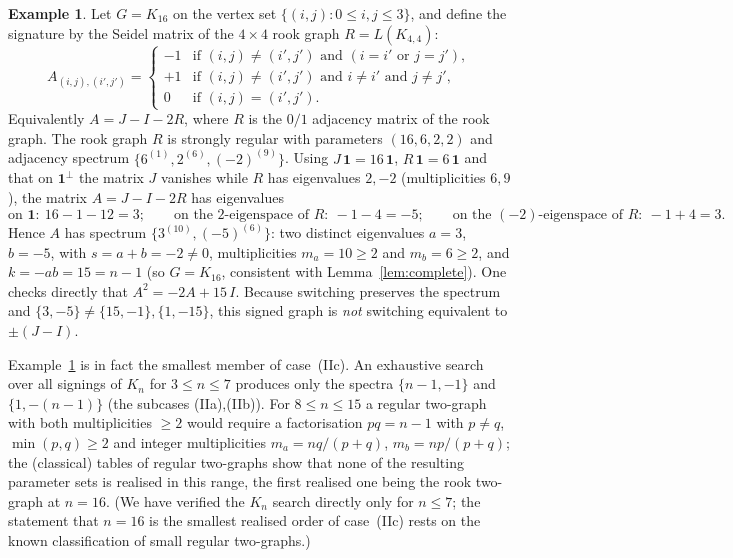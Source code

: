 \documentclass{amsart}
\theoremstyle{definition}
\newtheorem{example}{Example}
\begin{document}
\begin{example}\label{ex:rook}
Let $G=K_{16}$ on the vertex set $\{(i,j):0\le i,j\le3\}$, and define the
signature by the Seidel matrix of the $4\times4$ rook graph $R=L(K_{4,4})$:
\[
A_{(i,j),(i',j')}=
\begin{cases}
-1 & \text{if }(i,j)\ne(i',j')\text{ and }(i=i'\text{ or }j=j'),\\
+1 & \text{if }(i,j)\ne(i',j')\text{ and }i\ne i'\text{ and }j\ne j',\\
0 & \text{if }(i,j)=(i',j').
\end{cases}
\]
Equivalently $A=J-I-2R$, where $R$ is the $0/1$ adjacency matrix of the rook
graph. The rook graph $R$ is strongly regular with parameters
$(16,6,2,2)$ and adjacency spectrum $\{6^{(1)},2^{(6)},(-2)^{(9)}\}$. Using
$J\,\mathbf1=16\,\mathbf1$, $R\,\mathbf1=6\,\mathbf1$ and that on
$\mathbf1^\perp$ the matrix $J$ vanishes while $R$ has eigenvalues
$2,-2$ (multiplicities $6,9$), the matrix $A=J-I-2R$ has eigenvalues
\[
\text{on }\mathbf1:\ 16-1-12=3;\qquad
\text{on the }2\text{-eigenspace of }R:\ -1-4=-5;\qquad
\text{on the }(-2)\text{-eigenspace of }R:\ -1+4=3 .
\]
Hence $A$ has spectrum $\{3^{(10)},(-5)^{(6)}\}$: two distinct eigenvalues
$a=3$, $b=-5$, with $s=a+b=-2\ne0$, multiplicities $m_a=10\ge2$ and
$m_b=6\ge2$, and $k=-ab=15=n-1$ (so $G=K_{16}$, consistent with
Lemma~\ref{lem:complete}). One checks directly that $A^2=-2A+15\,I$. Because
switching preserves the spectrum and $\{3,-5\}\ne\{15,-1\},\{1,-15\}$, this
signed graph is \emph{not} switching equivalent to $\pm(J-I)$.
\end{example}

Example~\ref{ex:rook} is in fact the smallest member of case~(IIc). An
exhaustive search over all signings of $K_n$ for $3\le n\le7$ produces only the
spectra $\{n-1,-1\}$ and $\{1,-(n-1)\}$ (the subcases (IIa),(IIb)). For
$8\le n\le15$ a regular two-graph with both multiplicities $\ge2$ would require
a factorisation $pq=n-1$ with $p\ne q$, $\min(p,q)\ge2$ and integer
multiplicities $m_a=nq/(p+q)$, $m_b=np/(p+q)$; the (classical) tables of
regular two-graphs show that none of the resulting parameter sets is realised
in this range, the first realised one being the rook two-graph at $n=16$. (We
have verified the $K_n$ search directly only for $n\le7$; the statement that
$n=16$ is the smallest realised order of case~(IIc) rests on the known
classification of small regular two-graphs.)
\end{document}
